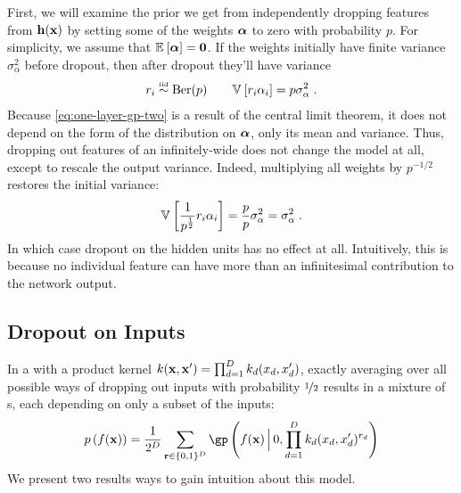 First, we will examine the prior we get from independently dropping features from ${\bf{h}}({\bf{x}})$ by setting some of the weights $\boldsymbol{\alpha}$ to zero with probability $p$.
For simplicity, we assume that $\mathbb{E}_{} \left[ {\boldsymbol{\alpha}} \right] = {\bf{0}}$.
If the weights initially have finite variance $\sigma^2_{\alpha}$ before dropout, then after dropout they'll have variance
\begin{align}
r_i \overset{\mbox{\tiny iid}}{\sim} \textnormal{Ber}(p)
\qquad
\mathbb{V}_{} \left[ {r_i \alpha_i} \right] = p \sigma_{\alpha}^2 \;.
\end{align}
Because \cref{eq:one-layer-gp-two} is a result of the central limit theorem, it does not depend on the form of the distribution on $\boldsymbol{\alpha}$, only its mean and variance.
Thus, dropping out features of an infinitely-wide \MLP{} does not change the model at all, except to rescale the output variance.
Indeed, multiplying all weights by $p^{-1/2}$ restores the initial variance:
\begin{align}
\mathbb{V}_{} \left[ { \frac{1}{p^\frac{1}{2}} r_i \alpha_i} \right] = \frac{p}{p} \sigma_{\alpha}^2 = \sigma_{\alpha}^2 \;.
\end{align}
In which case dropout on the hidden units has no effect at all.
Intuitively, this is because no individual feature can have more than an infinitesimal contribution to the network output.


\subsection{Dropout on Inputs}

In a \gp{} with a product kernel ${k({\bf{x}}, {\bf{x}}') = \prod_{d=1}^D k_d(x_d, x_d')}$, exactly averaging over all possible ways of dropping out inputs with probability $\nicefrac{1}{2}$ results in a mixture of \gp{}s, each depending on only a subset of the inputs:
\begin{align}
p \left( f(\vx) \right)
= \frac{1}{2^D} \sum_{\vr \in \{0,1\}^D}  \textnormal{\gp} \left(f(\vx) \,\Big|\, 0, \prod_{d=1}^D k_d(x_d, x_d')^{r_d} \right)
\label{eq:dropout-mixture}
\end{align}
We present two results ways to gain intuition about this model.

